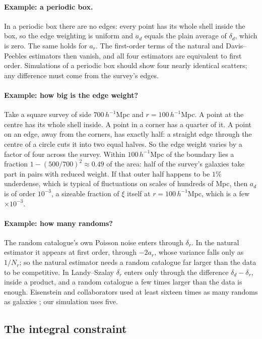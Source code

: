 \paragraph{Example: a periodic box.}
In a periodic box there are no edges: every point has its whole shell inside the
box, so the edge weighting is uniform and $a_d$ equals the plain average of
$\delta_d$, which is zero. The same holds for $a_r$. The first-order terms of the
natural and Davis--Peebles estimators then vanish, and all four estimators are
equivalent to first order. Simulations of a periodic box should show four nearly
identical scatters; any difference must come from the survey's edges.

\paragraph{Example: how big is the edge weight?}
Take a square survey of side $700\,h^{-1}$Mpc and $r=100\,h^{-1}$Mpc. A point at
the centre has its whole shell inside. A point in a corner has a quarter of it. A point on an edge, away from the corners, has exactly half: a straight
edge through the centre of a circle cuts it into two equal halves. So the edge weight varies by a factor of
four across the survey. Within $100\,h^{-1}$Mpc of the boundary lies a fraction
$1-(500/700)^2\approx0.49$ of the area: half of the survey's galaxies take part
in pairs with reduced weight. If that outer half happens to be $1\%$ underdense,
which is typical of fluctuations on scales of hundreds of Mpc, then $a_d$ is of order
$10^{-3}$, a sizeable fraction of $\xi$ itself at $r=100\,h^{-1}$Mpc, which is a few $\times10^{-3}$.

\paragraph{Example: how many randoms?}
The random catalogue's own Poisson noise enters through $\delta_r$. In the natural
estimator it appears at first order, through $-2a_r$, whose variance falls only
as $1/N_r$; so the natural estimator needs a random catalogue far larger than
the data to be competitive. In Landy--Szalay $\delta_r$ enters only through the
difference $\delta_d-\delta_r$, inside a product, and a random catalogue a few
times larger than the data is enough. Eisenstein and collaborators used at least
sixteen times as many randoms as galaxies ; our
simulation uses five.

\subsection{The integral constraint}
\label{11a:sec:integral-constraint}

